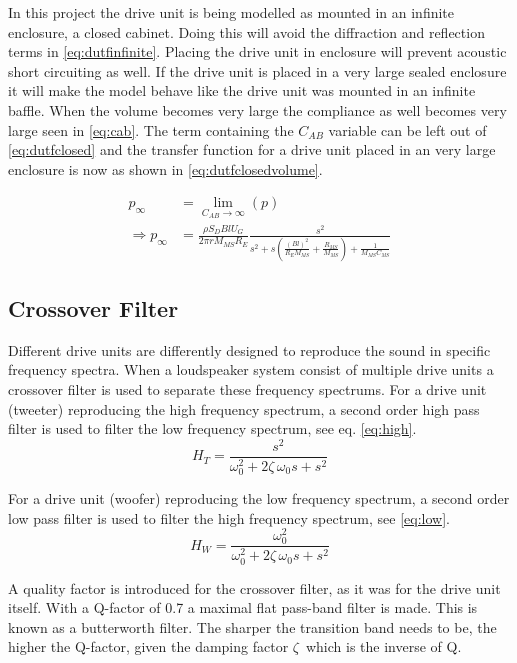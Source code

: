 In this project the drive unit is being modelled as mounted in an infinite enclosure, a closed cabinet. Doing this will avoid the diffraction and reflection terms in \cref{eq:dutfinfinite}.
Placing the drive unit in enclosure will prevent acoustic short circuiting as well.   
If the drive unit is placed in a very large sealed enclosure it will make the model behave like the drive unit was mounted in an infinite baffle.  
When the volume becomes very large the compliance as well becomes very large seen in \cref{eq:cab}. 
The term containing the $C_{AB}$ variable can be left out of \cref{eq:dutfclosed} and the transfer function for a drive unit placed in an very large enclosure is now as shown in \cref{eq:dutfclosedvolume}.

\begin{align}
	p_\infty &= \lim_{C_{AB}\rightarrow\infty}\left(p\right) \\
	\Rightarrow p_\infty &= \frac{\rho S_D B l U_G}{2\pi r M_{MS} R_E}\frac{s^2}{s^2 +s \left(\frac{(Bl)^2}{R_EM_{MS}}+\frac{R_{MS}}{M_{MS}}\right)+\frac{1}{M_{MS}C_{MS}}}
	\label{eq:dutfclosedvolume}
\end{align}

\subsection{Crossover Filter}
Different drive units are differently designed to reproduce the sound in specific frequency spectra.
When a loudspeaker system consist of multiple drive units a crossover filter is used to separate these frequency spectrums.
For a drive unit (tweeter) reproducing the high frequency spectrum, a second order high pass filter is used to filter the low frequency spectrum, see eq. \ref{eq:high}.\cite[p.~82-83]{Elektroakustik}
\begin{equation}
H_{T} = \frac{s^2}{\omega_0^2+2\zeta\,\omega_0 s+s^2}
\label{eq:high}
\end{equation}

\newpage For a drive unit (woofer) reproducing the low frequency spectrum, a second order low pass filter is used to filter the high frequency spectrum, see \cref{eq:low}.
\begin{equation}
H_{W} = \frac{\omega_0^2}{\omega_0^2+2\zeta\,\omega_0 s+s^2}
\label{eq:low}
\end{equation}

A quality factor is introduced for the crossover filter, as it was for the drive unit itself. 
With a Q-factor of 0.7 a maximal flat pass-band filter is made.
This is known as a butterworth filter. 
The sharper the transition band needs to be, the higher the Q-factor, given the damping factor $\zeta\,$ which is the inverse of Q. 

